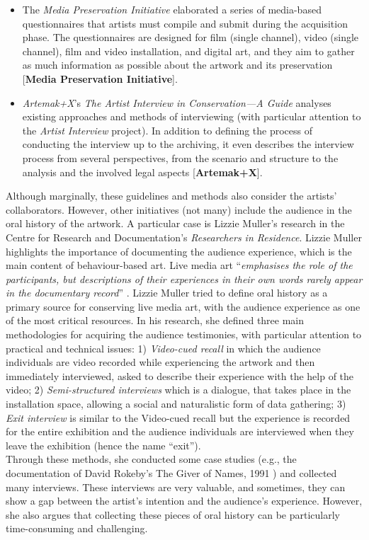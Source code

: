 \begin{itemize}
    \item The \textit{Media Preservation Initiative} elaborated a series of media-based questionnaires that artists must compile and submit during the acquisition phase. The questionnaires are designed for film (single channel), video (single channel), film and video installation, and digital art, and they aim to gather as much information as possible about the artwork and its preservation [\textbf{Media Preservation Initiative}].
    \item \textit{Artemak+X}’s \textit{The Artist Interview in Conservation—A Guide} \cite{debik2022artistinterview} analyses existing approaches and methods of interviewing (with particular attention to the \textit{Artist Interview} project). In addition to defining the process of conducting the interview up to the archiving, it even describes the interview process from several perspectives, from the scenario and structure to the analysis and the involved legal aspects [\textbf{Artemak+X}].
\end{itemize}

Although marginally, these guidelines and methods also consider the artists’ collaborators. However, other initiatives (not many) include the audience in the oral history of the artwork. A particular case is Lizzie Muller's research in the Centre for Research and Documentation’s \textit{Researchers in Residence}. Lizzie Muller highlights the importance of documenting the audience experience, which is the main content of behaviour-based art. Live media art ``\textit{emphasises the role of the participants, but descriptions of their experiences in their own words rarely appear in the documentary record}'' \cite{muller2008towards}. Lizzie Muller tried to define oral history as a primary source for conserving live media art, with the audience experience as one of the most critical resources. In his research, she defined three main methodologies for acquiring the audience testimonies, with particular attention to practical and technical issues: 1) \textit{Video-cued recall} in which the audience individuals are video recorded while experiencing the artwork and then immediately interviewed, asked to describe their experience with the help of the video; 2) \textit{Semi-structured interviews} which is a dialogue, that takes place in the installation space, allowing a social and naturalistic form of data gathering; 3) \textit{Exit interview} is similar to the Video-cued recall but the experience is recorded for the entire exhibition and the audience individuals are interviewed when they leave the exhibition (hence the name “exit”).\\
Through these methods, she conducted some case studies (e.g., the documentation of David Rokeby’s The Giver of Names, 1991 \cite{jones2008david}) and collected many interviews. These interviews are very valuable, and sometimes, they can show a gap between the artist’s intention and the audience's experience. However, she also argues that collecting these pieces of oral history can be particularly time-consuming and challenging.

